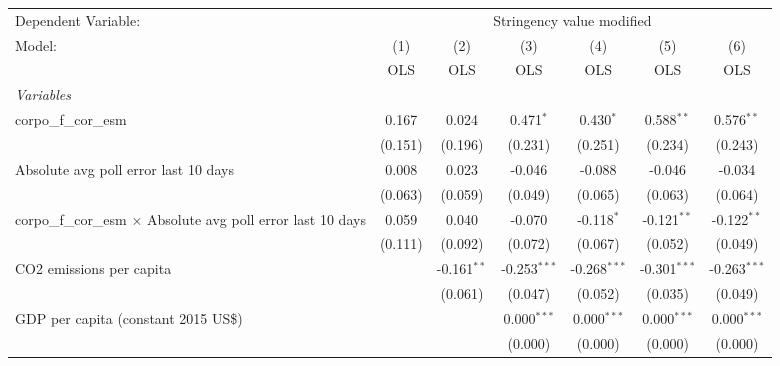 
\begingroup
\centering
\begin{tabular}{lcccccc}
   \toprule
   Dependent Variable: & \multicolumn{6}{c}{Stringency value modified}\\
   Model:                                                               & (1)     & (2)           & (3)            & (4)            & (5)            & (6)\\  
                                                                        &  OLS    & OLS           & OLS            & OLS            & OLS            & OLS\\  
   \midrule
   \emph{Variables}\\
   corpo\_f\_cor\_esm                                                   & 0.167   & 0.024         & 0.471$^{*}$    & 0.430$^{*}$    & 0.588$^{**}$   & 0.576$^{**}$\\   
                                                                        & (0.151) & (0.196)       & (0.231)        & (0.251)        & (0.234)        & (0.243)\\   
   Absolute avg poll error last 10 days                                 & 0.008   & 0.023         & -0.046         & -0.088         & -0.046         & -0.034\\   
                                                                        & (0.063) & (0.059)       & (0.049)        & (0.065)        & (0.063)        & (0.064)\\   
   corpo\_f\_cor\_esm $\times$ Absolute avg poll error last 10 days     & 0.059   & 0.040         & -0.070         & -0.118$^{*}$   & -0.121$^{**}$  & -0.122$^{**}$\\   
                                                                        & (0.111) & (0.092)       & (0.072)        & (0.067)        & (0.052)        & (0.049)\\   
   CO2 emissions per capita                                             &         & -0.161$^{**}$ & -0.253$^{***}$ & -0.268$^{***}$ & -0.301$^{***}$ & -0.263$^{***}$\\   
                                                                        &         & (0.061)       & (0.047)        & (0.052)        & (0.035)        & (0.049)\\   
   GDP per capita (constant 2015 US\$)                                  &         &               & 0.000$^{***}$  & 0.000$^{***}$  & 0.000$^{***}$  & 0.000$^{***}$\\   
                                                                        &         &               & (0.000)        & (0.000)        & (0.000)        & (0.000)\\   

\end{tabular}
